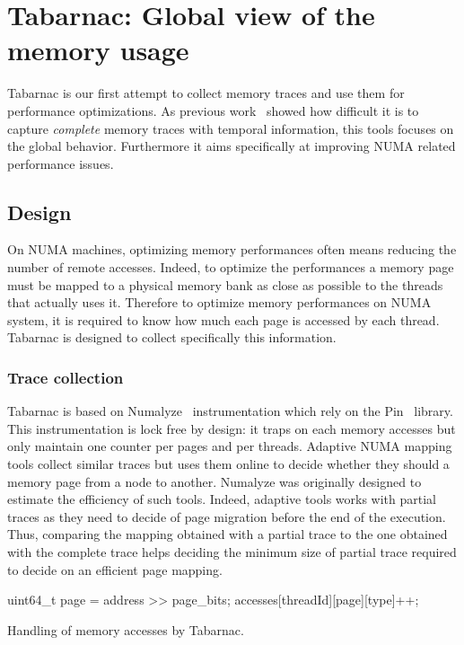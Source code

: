 \section{Tabarnac: Global view of the memory usage}
\label{sec:Tabarnac}

\acrfull{Tabarnac} is our first attempt to collect memory traces and use them for performance optimizations.
As previous work~\cite{Beniamine13Cartographier} showed how difficult it is to capture \emph{complete} memory traces with temporal information, this tools focuses on the global behavior.
Furthermore it aims specifically at improving \gls{NUMA} related performance issues.

\subsection{Design}

On \gls{NUMA} machines, optimizing memory performances often means reducing the number of remote accesses.
Indeed, to optimize the performances a memory page must be mapped to a physical memory bank as close as possible to the threads that actually uses it.
Therefore to optimize memory performances on \gls{NUMA} system, it is required to know how much each page is accessed by each thread.
\gls{Tabarnac} is designed to collect specifically this information.

\subsubsection{Trace collection}

\gls{Tabarnac} is based on \gls{Numalyze}~\cite{Diener15Characterizing} instrumentation which rely on the \gls{Pin}~\cite{Luk05Pin} library.
This instrumentation is lock free by design: it traps on each memory accesses but only maintain one counter per pages and per threads.
Adaptive \gls{NUMA} mapping tools collect similar traces but uses them online to decide whether they should a memory page from a node to another.
\gls{Numalyze} was originally designed to estimate the efficiency of such tools.
Indeed, adaptive tools works with partial traces as they need to decide of page migration before the end of the execution.
Thus, comparing the mapping obtained with a partial trace to the one obtained with the complete trace helps deciding the minimum size of partial trace required to decide on an efficient page mapping.

\begin{algorithm}[htb]
    \begin{algorithmic}
            \State uint64\_t page = address >> page\_bits;
            \State accesses[threadId][page][type]++;
        \EndFunction
    \end{algorithmic}
    \caption{Handling of memory accesses by Tabarnac.}
    \label{alg:Tabarnac}
\end{algorithm}


